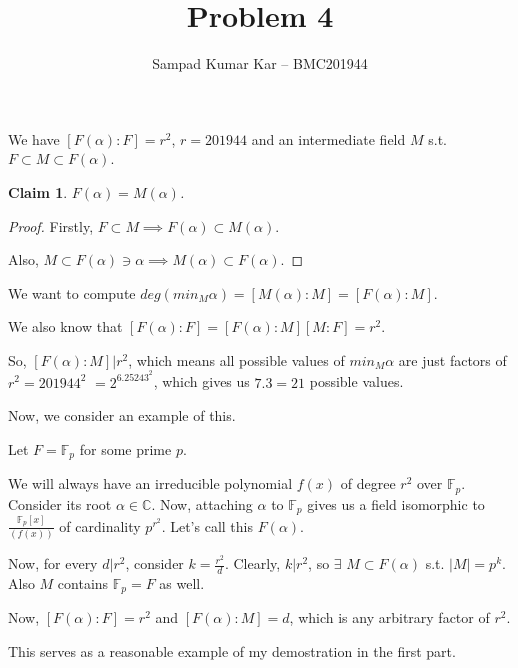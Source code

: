 \documentclass[12pt,a4paper]{article}
\title{Problem 4}
\author{Sampad Kumar Kar -- BMC201944}
\newtheorem{claim}[theorem]{Claim}
\theoremstyle{definition}
\begin{document}
\maketitle

\begin{flushleft}

We have $[F(\alpha):F] = r^2$, $r = 201944$ and an intermediate field $M$ s.t. $F \subset M \subset F(\alpha)$.

\medskip

\begin{claim}
	$F(\alpha) = M(\alpha)$.
\end{claim}

\begin{proof}
	Firstly, $F \subset M \implies F(\alpha) \subset M(\alpha)$.

	Also, $M \subset F(\alpha) \ni \alpha \implies M(\alpha) \subset F(\alpha)$.
\end{proof}

We want to compute $deg(min_{M} \alpha) = [M(\alpha):M] = [F(\alpha):M]$.

We also know that $[F(\alpha):F] = [F(\alpha):M][M:F] = r^2$.

\medskip

So, $[F(\alpha):M]|r^2$, which means all possible values of $min_{M} \alpha$ are just factors of $r^2 = 201944^2$ $= 2^6.25243^2$, which gives us $7.3 = 21$ possible values.

\bigskip
\bigskip

Now, we consider an example of this.

\medskip

Let $F = \mathbb{F}_{p}$ for some prime $p$.

We will always have an irreducible polynomial $f(x)$ of degree $r^2$ over $\mathbb{F}_{p}$. Consider its root $\alpha \in \mathbb{C}$. Now, attaching $\alpha$ to $\mathbb{F}_{p}$ gives us a field isomorphic to $\frac{\mathbb{F}_{p}[x]}{(f(x))}$ of cardinality $p^{r^2}$. Let's call this $F(\alpha)$.

Now, for every $d|r^2$, consider $k = \frac{r^2}{d}$. Clearly, $k|r^2$, so $\exists$ $M \subset F(\alpha)$ s.t. $|M| = p^k$. Also $M$ contains $\mathbb{F}_{p} = F$ as well.

\medskip

Now, $[F(\alpha):F] = r^2$ and $[F(\alpha):M] = d$, which is any arbitrary factor of $r^2$.

This serves as a reasonable example of my demostration in the first part.

\end{flushleft}
\end{document}
